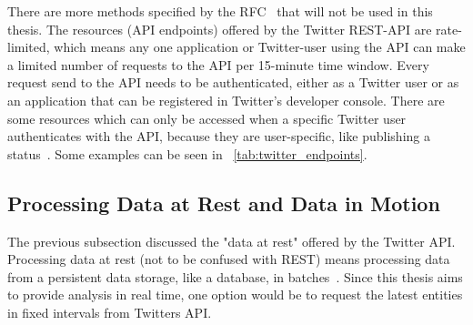 There are more methods specified by the RFC~\cite{RFC2616} that will not be used in this thesis.
The resources (API endpoints) offered by the Twitter REST-API are rate-limited,
which means any one application or Twitter-user using the API can make a limited number of requests to the API
per 15-minute time window.
Every request send to the API needs to be authenticated,
either as a Twitter user or as an application that can be registered in Twitter's developer console.
There are some resources which can only be accessed when a specific Twitter user authenticates
with the API, because they are user-specific, like publishing a status~\cite{twitterDocs}.
Some examples can be seen in ~\cref{tab:twitter_endpoints}.

\begin{table}
    \caption{A selection of resources offered by the Twitter REST API~\cite{twitterDocs}}
    \label{tab:twitter_endpoints}
\end{table}

\subsection{Processing Data at Rest and Data in Motion}
\label{subsec:dataAtRest-DataInMotion}

The previous subsection discussed the "data at rest" offered by the Twitter API.
Processing data at rest (not to be confused with REST) means processing data from a persistent data storage, like a database, in batches~\cite{Nandi2015}.
Since this thesis aims to provide analysis in real time, one option would be to request the latest entities in fixed intervals from
Twitters API.

